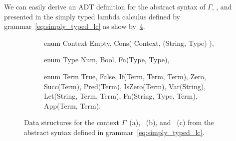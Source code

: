 \documentclass[
  oneside,
  english,
  coorientadorbanca,
  noabntexcite
]{ufsc-thesis-rn46-2019}
\newcommand{\code}[1]{\text{\scpfamily\setlength\spaceskip{0.35em}#1}}
\begin{document}
We can easily derive an ADT definition for the abstract syntax of $\Gamma$, \code{term}, and \code{Type} presented in the simply typed lambda calculus defined by grammar~\eqref{eq:simply_typed_lc} as show by~\cref{fig:typeof_adt}.

\begin{figure}[ht]
  \centering
  \begin{subfigure}[b]{0.3\textwidth}
    \begin{minipage}{\textwidth}
      \begin{rustcode}
enum Context {
  Empty,
  Cons(
    Context,
    (String, Type)
  ),
}
      \end{rustcode}
    \end{minipage}
    \caption{
    }\label{fig:typeof_context_adt}
  \end{subfigure}
  \quad
  \begin{subfigure}[b]{0.3\textwidth}
    \begin{minipage}{\textwidth}
      \begin{rustcode}
enum Type {
  Num,
  Bool,
  Fn(Type, Type),
}
      \end{rustcode}
    \end{minipage}
    \caption{}\label{fig:typeof_type_adt}
  \end{subfigure}
  \quad
  \begin{subfigure}[b]{0.3\textwidth}
    \begin{minipage}{\textwidth}
      \begin{rustcode}
enum Term {
  True,
  False,
  If(Term, Term, Term),
  Zero,
  Succ(Term),
  Pred(Term),
  IsZero(Term),
  Var(String),
  Let(String, Term, Term),
  Fn(String, Type, Term),
  App(Term, Term),
}
      \end{rustcode}
    \end{minipage}
    \caption{}\label{fig:typeof_term_adt}
  \end{subfigure}
  \caption{
    Data structures for the context $\Gamma$~(a), \code{Type}~(b), and \code{term}~(c) from the abstract syntax defined in grammar~\eqref{eq:simply_typed_lc}.
  }\label{fig:typeof_adt}
\end{figure}
\end{document}

